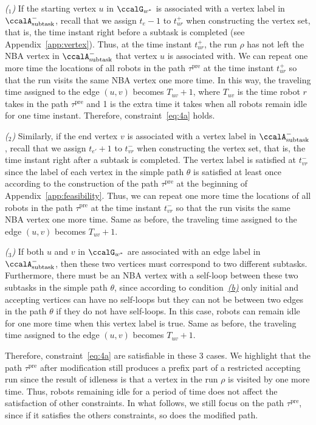 \documentclass[Afour,sageh,times]{sagej}
\newcounter{mycounter}
\newcommand{\auto}[1]{\ccalA_{\textup{#1}}}
\begin{document}
{{{\it ($_1$)} If the starting vertex $u$ in $\ccalG_{w^*}$ is associated with a vertex label in $\auto{subtask}^-$, recall that we assign $t_e-1$ to $t_{ur}^+$ when constructing the vertex set, that is, the time instant right before a subtask is completed (see Appendix~\ref{app:vertex}). Thus, at the time instant $t_{ur}^+$, the run $\rho$ has not left the NBA vertex in $\auto{subtask}^-$ that vertex $u$ is associated with. We can repeat one more time the locations of all robots in the path $\tau^\text{pre}$ at the time instant $t_{ur}^+$  so that the run visits the same NBA vertex  one more time. In this way, the traveling time assigned to  the edge $(u,v)$ becomes $T_{uv}+1$, where $T_{uv}$ is the time robot $r$ takes in the path $\tau^\text{pre}$ and 1 is the extra time it takes when all robots remain idle for one time instant. Therefore, constraint~\eqref{eq:4a} holds.

{\it ($_2$)} Similarly, if the end vertex $v$ is associated with a vertex label in $\auto{subtask}^-$, recall that we assign $t_{e'}+1$ to $t_{vr}^-$ when constructing the vertex set, that is, the time instant right after a subtask is completed. The vertex label is satisfied at $t_{vr}^-$ since the  label of each vertex in the simple path $\theta$ is satisfied at least once according to the construction of the path $\tau^\text{pre}$ at the beginning of Appendix~\ref{app:feasibility}. Thus, we can repeat one more  time the locations of all robots in the path $\tau^\text{pre}$ at the time instant $t_{vr}^-$  so that the run visits the same NBA vertex  one  more time. Same as before, the traveling time assigned to  the edge $(u,v)$ becomes $T_{uv}+1$.

{\it ($_3$)} If both $u$ and $v$ in $\ccalG_{w^*}$ are associated with an edge label in $\auto{subtask}^-$, then these two vertices must correspond to two different subtasks. Furthermore, there must be an NBA vertex with a  self-loop between these two subtasks in the simple path $\theta$, since according to condition~\hyperref[cond:b]{\it (b)} only initial and accepting vertices can have no self-loops but they can not be between two edges in the path $\theta$ if they do not have self-loops. In this case, robots can remain idle for one more time  when this vertex label is true. Same as before, the traveling time assigned to  the edge $(u,v)$ becomes $T_{uv}+1$.


Therefore, constraint~\eqref{eq:4a} are satisfiable in these 3 cases. We highlight that the path $\tau^\text{pre}$ after modification still produces a prefix part of a restricted accepting run since the result of idleness is  that a vertex in the run $\rho$ is visited by one more time.  Thus, robots remaining idle for a period of time does not affect the satisfaction of other constraints. In what follows, we still focus on the path $\tau^\text{pre}$, since if it satisfies the others constraints, so does the modified path.

}}
\end{document}
